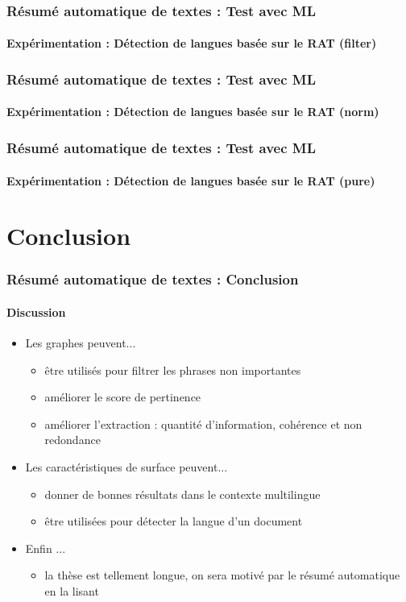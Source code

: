\documentclass[xcolor=table]{beamer}
\begin{document}
\begin{frame}
\frametitle{Résumé automatique de textes : Test avec ML}
\framesubtitle{Expérimentation : Détection de langues basée sur le RAT (filter)}
	
	
	
\end{frame}

\begin{frame}
\frametitle{Résumé automatique de textes : Test avec ML}
\framesubtitle{Expérimentation : Détection de langues basée sur le RAT (norm)}
	
	
	
\end{frame}

\begin{frame}
\frametitle{Résumé automatique de textes : Test avec ML}
\framesubtitle{Expérimentation : Détection de langues basée sur le RAT (pure)}
	
	
	
\end{frame}


\appendix

\section*{Conclusion}

\begin{frame}
\frametitle{Résumé automatique de textes : Conclusion}
\framesubtitle{Discussion}
	
\begin{itemize}
	\item Les graphes peuvent...
	\begin{itemize}
		\item être utilisés pour filtrer les phrases non importantes
		\item améliorer le score de pertinence
		\item améliorer l'extraction : quantité d'information, cohérence et non redondance
	\end{itemize}
	\item Les caractéristiques de surface peuvent...
	\begin{itemize}
		\item donner de bonnes résultats dans le contexte multilingue
		\item être utilisées pour détecter la langue d'un document
	\end{itemize}
	\item Enfin ...
	\begin{itemize}
		\item la thèse est tellement longue, on sera motivé par le résumé automatique en la lisant
	\end{itemize}
\end{itemize}
	
\end{frame}
\end{document}
